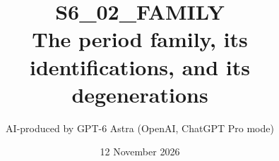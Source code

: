 \documentclass[11pt,a4paper]{article}
\title{S6\_02\_FAMILY\\The period family, its identifications, and its degenerations}
\author{AI-produced by GPT-6 Astra (OpenAI, ChatGPT Pro mode)}
\date{12 November 2026}
\theoremstyle{definition}
\begin{document}
\maketitle
\begingroup\small

\endgroup
\clearpage
\tableofcontents
\clearpage







\end{document}
